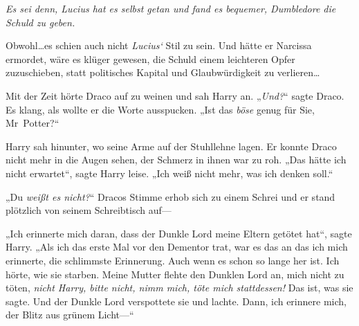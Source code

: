 \emph{Es sei denn, Lucius hat es selbst getan und fand es bequemer, Dumbledore die Schuld zu geben.}

Obwohl…es schien auch nicht \emph{Lucius‘} Stil zu sein. Und hätte er Narcissa ermordet, wäre es klüger gewesen, die Schuld einem leichteren Opfer zuzuschieben, statt politisches Kapital und Glaubwürdigkeit zu verlieren…

Mit der Zeit hörte Draco auf zu weinen und sah Harry an. „\emph{Und?}“ sagte Draco. Es klang, als wollte er die Worte ausspucken. „Ist das \emph{böse} genug für Sie, Mr~Potter?“

Harry sah hinunter, wo seine Arme auf der Stuhllehne lagen. Er konnte Draco nicht mehr in die Augen sehen, der Schmerz in ihnen war zu roh. „Das hätte ich nicht erwartet“, sagte Harry leise. „Ich weiß nicht mehr, was ich denken soll.“

„Du \emph{weißt es nicht?}“ Dracos Stimme erhob sich zu einem Schrei und er stand plötzlich von seinem Schreibtisch auf—

„Ich erinnerte mich daran, dass der Dunkle Lord meine Eltern getötet hat“, sagte Harry. „Als ich das erste Mal vor den Dementor trat, war es das an das ich mich erinnerte, die schlimmste Erinnerung. Auch wenn es schon so lange her ist. Ich hörte, wie sie starben. Meine Mutter flehte den Dunklen Lord an, mich nicht zu töten, \emph{nicht Harry, bitte nicht, nimm mich, töte mich stattdessen!} Das ist, was sie sagte. Und der Dunkle Lord verspottete sie und lachte. Dann, ich erinnere mich, der Blitz aus grünem Licht—“


